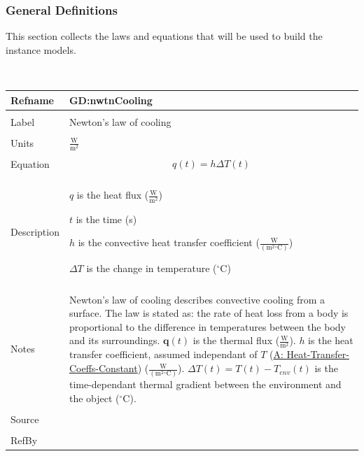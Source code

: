 \documentclass[12pt]{article}
\begin{document}
\subsubsection{General Definitions}
\label{Sec:GDs}
This section collects the laws and equations that will be used to build the instance models.
\par~

\noindent \begin{minipage}{\textwidth}
\begin{tabular}{p{} p{}}
\toprule \textbf{Refname} & \textbf{GD:nwtnCooling}
\label{GD:nwtnCooling}
\\ \midrule \\
Label & Newton's law of cooling
\\ \midrule \\
Units & $\frac{\text{W}}{\text{m}^{2}}$
\\ \midrule \\
Equation & \begin{displaymath}
           q\left(t\right)=h ΔT\left(t\right)
           \end{displaymath}
\\ \midrule \\
Description & \begin{symbDescription}
              \item{$q$ is the heat flux ($\frac{\text{W}}{\text{m}^{2}}$)}
              \item{$t$ is the time (s)}
              \item{$h$ is the convective heat transfer coefficient ($\frac{\text{W}}{(\text{m}^{2}{}^{\circ}\text{C})}$)}
              \item{$ΔT$ is the change in temperature (${}^{\circ}$C)}
              \end{symbDescription}
\\ \midrule \\
Notes & Newton's law of cooling describes convective cooling from a surface. The law is stated as: the rate of heat loss from a body is proportional to the difference in temperatures between the body and its surroundings. $\mathbf{q}\left(t\right)$ is the thermal flux ($\frac{\text{W}}{\text{m}^{2}}$). $h$ is the heat transfer coefficient, assumed independant of $T$ (\hyperref[assumpHTCC]{A: Heat-Transfer-Coeffs-Constant}) ($\frac{\text{W}}{(\text{m}^{2}{}^{\circ}\text{C})}$). $ΔT\left(t\right)=T\left(t\right)-{T_{env}}\left(t\right)$ is the time-dependant thermal gradient between the environment and the object (${}^{\circ}$C).
\\ \midrule \\
Source & \cite[(pg. 8)]{incroperaEtAl2007}
\\ \midrule \\
RefBy & 
\\ \bottomrule \end{tabular}
\end{minipage}
\par~
\end{document}
